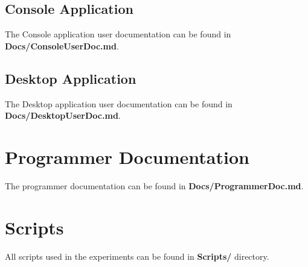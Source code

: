 \documentclass[12pt,a4paper]{report}
\let\openright=\clearpage
\begin{document}
\subsection{Console Application}
\label{app:consoleapp}
The Console application user documentation can be found in \textbf{Docs/ConsoleUserDoc.md}.

\subsection{Desktop Application}
\label{app:desktopapp}
The Desktop application user documentation can be found in \textbf{Docs/DesktopUserDoc.md}.

\section{Programmer Documentation}
\label{app:programmerdoc}
The programmer documentation can be found in \textbf{Docs/ProgrammerDoc.md}.

\section{Scripts}
\label{app:scripts}
All scripts used in the experiments can be found in \textbf{Scripts/} directory.

\openright
\end{document}
